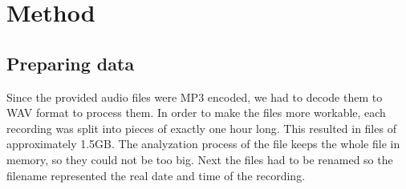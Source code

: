 \documentclass[a4paper]{article}
\begin{document}
\section*{Method}

\subsection*{Preparing data }
Since the provided audio files were MP3 encoded, we had to decode them to WAV format to process them. In order to make the files more workable, each recording was split into pieces of exactly one hour long. This resulted in files of approximately 1.5GB. The analyzation process of the file keeps the whole file in memory, so they could not be too big. Next the files had to be renamed so the filename represented the real date and time of the recording. 

\end{document}

